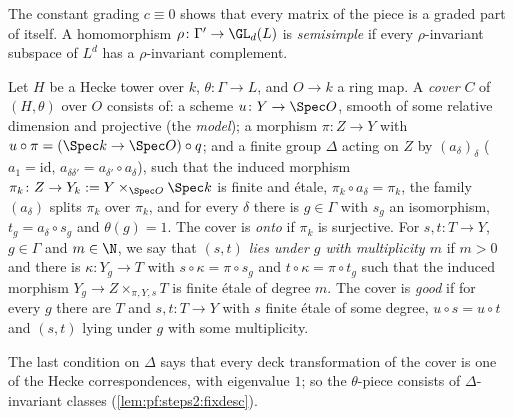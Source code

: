 The constant grading $c\equiv0$ shows that every matrix of the piece is a graded part of itself.
A homomorphism $\rho\colon\Gamma'\to\GL_d(L)$ is \emph{semisimple} if every $\rho$-invariant subspace
of $L^d$ has a $\rho$-invariant complement.

\begin{definition}[Covers]\label{def:pf:steps2:cover}
Let $H$ be a Hecke tower over $k$, $\theta\colon\Gamma\to L$, and $O\to k$ a ring map. A
\emph{cover} $C$ of $(H,\theta)$ over $O$ consists of: a scheme $u\colon Y\to\Spec O$, smooth of some
relative dimension and projective (the \emph{model}); a morphism $\pi\colon Z\to Y$ with
$u\circ\pi=(\Spec k\to\Spec O)\circ q$; and a finite group $\Delta$ acting on $Z$ by
$(a_\delta)_\delta$ ($a_1=\mathrm{id}$, $a_{\delta\delta'}=a_{\delta'}\circ a_\delta$), such that the
induced morphism $\pi_k\colon Z\to Y_k:=Y\times_{\Spec O}\Spec k$ is finite and \'etale,
$\pi_k\circ a_\delta=\pi_k$, the family $(a_\delta)$ splits $\pi_k$ over $\pi_k$, and for every
$\delta$ there is $g\in\Gamma$ with $s_g$ an isomorphism, $t_g=a_\delta\circ s_g$ and $\theta(g)=1$.
The cover is \emph{onto} if $\pi_k$ is surjective. For $s,t\colon T\to Y$, $g\in\Gamma$ and $m\in\N$,
we say that \emph{$(s,t)$ lies under $g$ with multiplicity $m$} if $m>0$ and there is
$\kappa\colon Y_g\to T$ with $s\circ\kappa=\pi\circ s_g$ and $t\circ\kappa=\pi\circ t_g$ such that the
induced morphism $Y_g\to Z\times_{\pi,Y,s}T$ is finite \'etale of degree $m$. The cover is
\emph{good} if for every $g$ there are $T$ and $s,t\colon T\to Y$ with $s$ finite \'etale of some
degree, $u\circ s=u\circ t$ and $(s,t)$ lying under $g$ with some multiplicity.
\end{definition}

The last condition on $\Delta$ says that every deck transformation of the cover is one of the Hecke
correspondences, with eigenvalue $1$; so the $\theta$-piece consists of $\Delta$-invariant classes
(\cref{lem:pf:steps2:fixdesc}).

